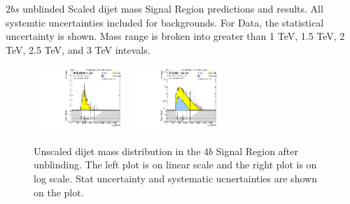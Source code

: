 \begin{table}[htbp!]
\scriptsize
\begin{center}

\caption{$2bs$ unblinded Scaled dijet mass Signal Region predictions and results. All systemtic uncertainties included for backgrounds. For Data, the statistical uncertainty is shown. Mass range is broken into greater than 1 TeV, 1.5 TeV, 2 TeV, 2.5 TeV, and 3 TeV intevals.}
\label{tab:sr-region-2b-pole}
\end{center}
\end{table}
\clearpage

\begin{figure}[htbp!]
\begin{center}
\includegraphics[width=0.31\textwidth,angle=-90]{figures/boosted/Signal_Syst/Moriond_bkg_9_FourTag_Signal_mHH_l.pdf}
\includegraphics[width=0.31\textwidth,angle=-90]{figures/boosted/Signal_Syst/Moriond_bkg_9_FourTag_Signal_mHH_l_1.pdf}
  \caption{Unscaled dijet mass distribution in the $4b$ Signal Region after unblinding. The left plot is on linear scale and the right plot is on log scale. Stat uncertainty and systematic ucnertainties are shown on the plot.}
  \label{fig:boosted-4b-signal-l}
\end{center}
\end{figure}

